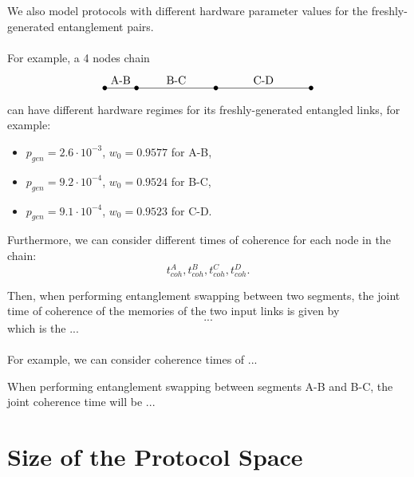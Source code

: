 \documentclass{article}
\begin{document}
We also model protocols with different hardware parameter values for the freshly-generated entanglement pairs.
\\\\
For example, a 4 nodes chain
\begin{equation*}
  \begin{tikzpicture}
    \coordinate (A) at (0, 0);
    \coordinate (B) at (1, 0);
    \coordinate (C) at (3.5, 0);
    \coordinate (D) at (6.5, 0);
  
    \draw (A) -- (B) node[midway, above] {A-B} -- (C) node[midway, above] {B-C} -- (D) node[midway, above] {C-D};
  
    \fill (A) circle (2pt);
    \fill (B) circle (2pt);
    \fill (C) circle (2pt);
    \fill (D) circle (2pt);
  \end{tikzpicture}
\end{equation*}
can have different hardware regimes for its freshly-generated entangled links, for example:
\begin{itemize}
  \item $p_{gen} = 2.6 \cdot 10^{-3}$, $w_0 = 0.9577$ for A-B,
  \item $p_{gen} = 9.2 \cdot 10^{-4}$, $w_0 = 0.9524$ for B-C,
  \item $p_{gen} = 9.1 \cdot 10^{-4}$, $w_0 = 0.9523$ for C-D.
\end{itemize}

Furthermore, we can consider different times of coherence for each node in the chain:
\begin{equation*}
  t_{coh}^A, t_{coh}^B, t_{coh}^C, t_{coh}^D .
\end{equation*}

Then, when performing entanglement swapping between two segments, the joint time of coherence of the memories of the two input links is given by
\begin{equation*}
  ...  
\end{equation*}
which is the ...
\\\\
For example, we can consider coherence times of ...

When performing entanglement swapping between segments A-B and B-C, the joint coherence time will be ...

\section*{Size of the Protocol Space}
\end{document}
